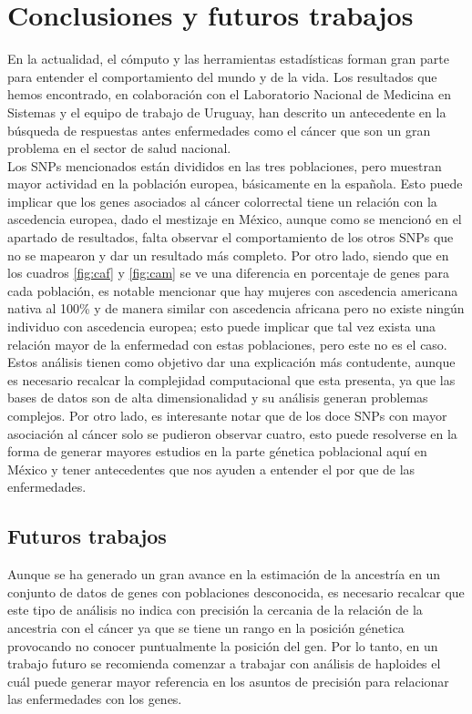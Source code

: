 \chapter{Conclusiones y futuros trabajos}

En la actualidad, el c\'omputo y las herramientas estad\'isticas forman gran parte para entender el comportamiento del mundo y de la vida. Los resultados que hemos encontrado, en colaboraci\'on con el Laboratorio Nacional de Medicina en Sistemas y el equipo de trabajo de Uruguay, han descrito un antecedente en la b\'usqueda de respuestas antes enfermedades como el c\'ancer que son un gran problema en el sector de salud nacional.\\

Los SNPs mencionados est\'an divididos en las tres poblaciones, pero muestran mayor actividad en la poblaci\'on europea, b\'asicamente en la española. Esto puede implicar que los genes asociados al c\'ancer colorrectal tiene un relaci\'on con la ascedencia europea,  dado el mestizaje en M\'exico, aunque como se mencion\'o en el apartado de resultados, falta observar el comportamiento de los otros SNPs que no se mapearon y dar un resultado m\'as completo. Por otro lado, siendo que en los cuadros \ref{fig:caf} y \ref{fig:cam} se ve una diferencia en porcentaje de genes para cada poblaci\'on, es notable mencionar que hay mujeres con ascedencia americana nativa al 100\% y de manera similar con ascedencia africana pero no existe ning\'un individuo con ascedencia europea; esto puede implicar que tal vez exista una relaci\'on mayor de la enfermedad con estas poblaciones, pero este no es el caso.\\

Estos an\'alisis tienen como objetivo dar una explicaci\'on m\'as contudente, aunque es necesario recalcar la complejidad computacional que esta presenta, ya que las bases de datos son de alta dimensionalidad y su an\'alisis generan problemas complejos. Por otro lado, es interesante notar que de los doce SNPs con mayor asociaci\'on al c\'ancer solo se pudieron observar cuatro, esto puede resolverse en la forma de generar mayores estudios en la parte g\'enetica poblacional aqu\'i en M\'exico y tener antecedentes que nos ayuden a entender el por que de las enfermedades. \\

\section{Futuros trabajos}

Aunque se ha generado un gran avance en la estimaci\'on de la ancestr\'ia en un conjunto de datos de genes con poblaciones desconocida, es necesario recalcar que este tipo de an\'alisis no indica con precisi\'on la cercania de la relaci\'on de la ancestria con el c\'ancer ya que se tiene un rango en la posici\'on g\'enetica provocando no conocer puntualmente la posici\'on del gen. Por lo tanto, en un trabajo futuro se recomienda comenzar a trabajar con an\'alisis de haploides el cu\'al puede generar mayor referencia en los asuntos de precisi\'on para relacionar las enfermedades con los genes.







